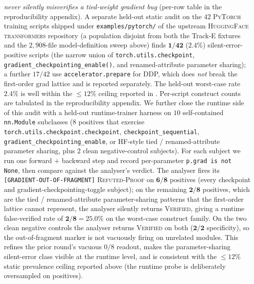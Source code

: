 \emph{never silently misverifies a tied-weight gradient bug}
(per-row table in the reproducibility appendix).
A separate held-out static audit on the $42$ \textsc{PyTorch}
training scripts shipped under \texttt{examples/pytorch/} of the
upstream \textsc{HuggingFace} \textsc{transformers} repository (a
population disjoint from both the Track-E fixtures and the
$2{,}908$-file model-definition sweep above) finds
$\mathbf{1/42}$ ($\mathbf{2.4\%}$) silent-error-positive scripts
(the narrow union of \texttt{torch.utils.checkpoint},
\texttt{gradient\_checkpointing\_enable()}, and
renamed-attribute parameter sharing); a further $17/42$ use
\texttt{accelerator.prepare} for DDP, which does \emph{not}
break the first-order grad lattice and is reported separately.
The held-out worst-case rate $2.4\%$ is well within the
$\le 12\%$ ceiling reported in .
Per-script construct counts are tabulated in the
reproducibility appendix.
We further close the runtime side of this audit with a held-out
runtime-trainer harness on $10$ self-contained \texttt{nn.Module}
subclasses ($8$ positives that exercise
\texttt{torch.utils.checkpoint.checkpoint},
\texttt{checkpoint\_sequential},
\texttt{gradient\_checkpointing\_enable}, or HF-style tied /
renamed-attribute parameter sharing, plus $2$ clean
negative-control subjects). For each subject we run one
forward + backward step and record per-parameter
\texttt{p.grad is not None}, then compare against the
analyser's verdict.  The analyser fires its
\texttt{[GRADIENT-OUT-OF-FRAGMENT]} \textsc{Refuted-Proof} on
$\mathbf{6/8}$ positives (every checkpoint and
gradient-checkpointing-toggle subject); on the remaining
$\mathbf{2/8}$ positives, which are the tied / renamed-attribute
parameter-sharing patterns that the first-order lattice cannot
represent, the analyser silently returns \textsc{Verified},
giving a runtime false-verified rate of
$\mathbf{2/8 = 25.0\%}$ on the worst-case construct family.
On the two clean negative controls the analyser returns
\textsc{Verified} on both ($\mathbf{2/2}$ specificity), so
the out-of-fragment marker is not vacuously firing on
unrelated modules. This refines the prior round's vacuous
$0/8$ readout, makes the parameter-sharing silent-error class
visible at the runtime level, and is consistent with the
$\le 12\%$ static prevalence ceiling reported above (the
runtime probe is deliberately oversampled on positives).


